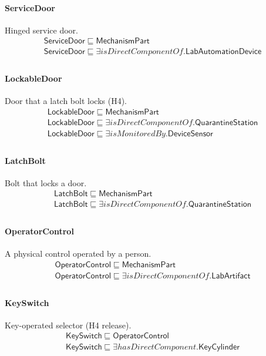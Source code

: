 \documentclass[10pt]{article}
\begin{document}
\paragraph{ServiceDoor} Hinged service door.
\[\begin{array}{l}
\mathsf{ServiceDoor} \sqsubseteq  \mathsf{MechanismPart} \\
\mathsf{ServiceDoor} \sqsubseteq  \exists \mathit{isDirectComponentOf}.\mathsf{LabAutomationDevice} \\
\end{array}\]
\paragraph{LockableDoor} Door that a latch bolt locks (H4).
\[\begin{array}{l}
\mathsf{LockableDoor} \sqsubseteq  \mathsf{MechanismPart} \\
\mathsf{LockableDoor} \sqsubseteq  \exists \mathit{isDirectComponentOf}.\mathsf{QuarantineStation} \\
\mathsf{LockableDoor} \sqsubseteq  \exists \mathit{isMonitoredBy}.\mathsf{DeviceSensor} \\
\end{array}\]
\paragraph{LatchBolt} Bolt that locks a door.
\[\begin{array}{l}
\mathsf{LatchBolt} \sqsubseteq  \mathsf{MechanismPart} \\
\mathsf{LatchBolt} \sqsubseteq  \exists \mathit{isDirectComponentOf}.\mathsf{QuarantineStation} \\
\end{array}\]
\paragraph{OperatorControl} A physical control operated by a person.
\[\begin{array}{l}
\mathsf{OperatorControl} \sqsubseteq  \mathsf{MechanismPart} \\
\mathsf{OperatorControl} \sqsubseteq  \exists \mathit{isDirectComponentOf}.\mathsf{LabArtifact} \\
\end{array}\]
\paragraph{KeySwitch} Key-operated selector (H4 release).
\[\begin{array}{l}
\mathsf{KeySwitch} \sqsubseteq  \mathsf{OperatorControl} \\
\mathsf{KeySwitch} \sqsubseteq  \exists \mathit{hasDirectComponent}.\mathsf{KeyCylinder} \\
\end{array}\]
\end{document}
